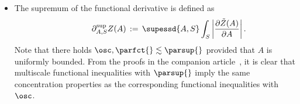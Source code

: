 \begin{itemize}
\[
\hspace{1.2cm}\lim_{t\to0}\frac{\tilde Z(A+tB)-\tilde Z(A)}t=\int_{\R^d}B(x)\frac{\partial\tilde Z(A)}{\partial A}(x)\,dx,
\]
if the limit exists. (The extension $\tilde Z$ is only needed to make sure that quantities like $\tilde Z(A+tB)$ make sense for small $t$, while $Z$ is a priori only defined on realizations of~$A$. In the sequel we will always assume that such an extension is implicitly given; this is typically the case in applications in stochastic\linebreak homogenization.) Since we are interested in the local averages of this derivative, we rather define for all bounded Borel subsets $S\subset\R^d$,
\begin{align*}
\hspace{1.2cm}\parfct{A,S}Z(A)=\int_S\Big|\frac{\partial\tilde Z(A)}{\partial A}(x)\Big|dx,
\end{align*}
which is alternatively characterized by
\begin{align*}
\hspace{1.2cm}\parfct{A,S} Z(A)
\,=\,\sup\left\{\limsup_{t\downarrow 0} \frac{\tilde Z(A+t B)-\tilde Z(A)}{t} \,:\, \supp{B}\subset S,\,\sup |B|\le 1\right\}.
\end{align*}
This derivative is additive wrt the set $S$: for all disjoint Borel subsets\linebreak$S_1,S_2\subset\R^d$ we have $\partial_{A,S_1\cup S_2}^{\fct}Z(A)=\partial_{A,S_1}^{\fct}Z(A)+\partial_{A,S_2}^{\fct}Z(A)$.
\item The supremum of the functional derivative is defined as
\begin{align*}
\hspace{1.2cm}\partial_{A,S}^{\sup}Z(A)\,:=\,\supessd{A,S}\int_S\left|\frac{\partial\tilde Z(A)}{\partial A}\right|.
\end{align*}
Note that there holds $\osc,\parfct{}\lesssim \parsup{}$ provided that $A$ is uniformly bounded. From the proofs in the companion article~\cite{DG1}, it is clear that multiscale functional inequalities with $\parsup{}$ imply the same concentration properties as the corresponding functional inequalities with $\osc$.
\end{itemize}

